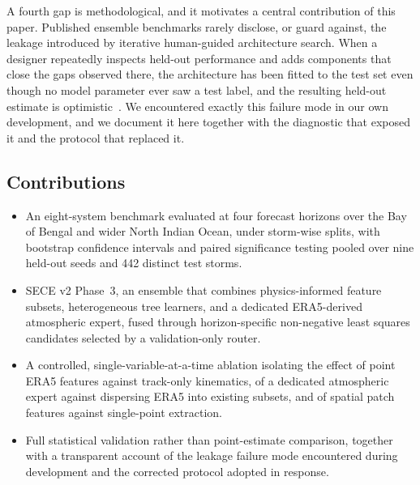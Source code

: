 \documentclass[10pt,twocolumn,a4paper]{article}
\newcommand{\sece}{SECE}
\newcommand{\bob}{Bay of Bengal}
\newcommand{\era}{ERA5}
\begin{document}
A fourth gap is methodological, and it motivates a central contribution of this
paper. Published ensemble benchmarks rarely disclose, or guard against, the
leakage introduced by iterative human-guided architecture search. When a designer
repeatedly inspects held-out performance and adds components that close the gaps
observed there, the architecture has been fitted to the test set even though no
model parameter ever saw a test label, and the resulting held-out estimate is
optimistic~\cite{cawley2010}. We encountered exactly this
failure mode in our own development, and we document it here together with the
diagnostic that exposed it and the protocol that replaced it.

\subsection{Contributions}
\begin{itemize}
\item An eight-system benchmark evaluated at four forecast horizons over the
\bob{} and wider North Indian Ocean, under storm-wise splits, with bootstrap
confidence intervals and paired significance testing pooled over nine held-out
seeds and 442 distinct test storms.

\item \sece{} v2 Phase~3, an ensemble that combines physics-informed feature
subsets, heterogeneous tree learners, and a dedicated \era{}-derived atmospheric
expert, fused through horizon-specific non-negative least squares candidates
selected by a validation-only router.

\item A controlled, single-variable-at-a-time ablation isolating the effect of
point \era{} features against track-only kinematics, of a dedicated atmospheric
expert against dispersing \era{} into existing subsets, and of spatial patch
features against single-point extraction.

\item Full statistical validation rather than point-estimate comparison, together
with a transparent account of the leakage failure mode encountered during
development and the corrected protocol adopted in response.
\end{itemize}

\end{document}
